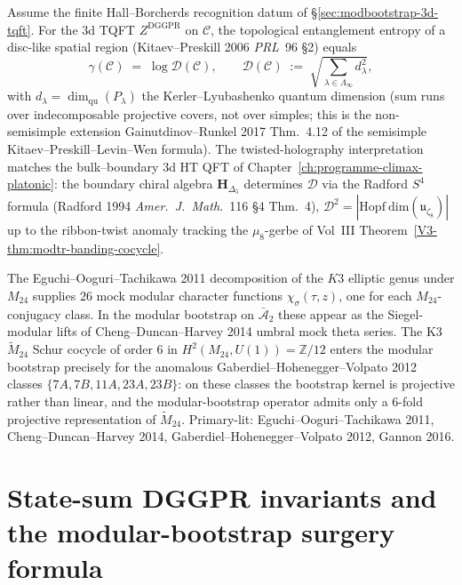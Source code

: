 \begin{remark}
\label{rem:modbootstrap-gamma-topological-entanglement}
Assume the finite Hall--Borcherds recognition datum of
\S\ref{sec:modbootstrap-3d-tqft}.
For the 3d TQFT $Z^{\mathrm{DGGPR}}$ on $\mathcal C$, the topological
entanglement entropy of a disc-like spatial region (Kitaev--Preskill
2006 \emph{PRL}~96 \S 2) equals
\[
 \gamma(\mathcal C)
 \;=\;
 \log\mathcal D(\mathcal C),
 \qquad
 \mathcal D(\mathcal C)
 \;:=\;
 \sqrt{\sum_{\lambda\in\Lambda_\infty}d_\lambda^2},
\]
with $d_\lambda = \dim_{\mathrm{qu}}(P_\lambda)$ the Kerler--Lyubashenko
quantum dimension (sum runs over indecomposable projective covers, not
over simples; this is the non-semisimple extension
Gainutdinov--Runkel 2017 Thm.~4.12 of the semisimple
Kitaev--Preskill--Levin--Wen formula). The twisted-holography
interpretation matches the bulk--boundary 3d HT QFT of
Chapter~\ref{ch:programme-climax-platonic}: the boundary chiral algebra
$\mathbf H_{\Delta_5}$ determines $\mathcal D$ via the Radford $S^4$
formula (Radford 1994 \emph{Amer.~J.~Math.}~116 \S 4 Thm.~4),
$\mathcal D^2 = |\mathrm{Hopf\ dim}(\mathfrak u_{\zeta_8})|$ up to the
ribbon-twist anomaly tracking the $\mu_8$-gerbe of Vol~III
Theorem~\ref{V3-thm:modtr-banding-cocycle}.
\end{remark}

\begin{remark}
\label{rem:modbootstrap-k3-mock-anomaly}
The Eguchi--Ooguri--Tachikawa 2011 decomposition of the $K3$ elliptic
genus under $M_{24}$ supplies $26$ mock modular character functions
$\chi_\sigma(\tau,z)$, one for each $M_{24}$-conjugacy class. In the
modular bootstrap on $\bar{\mathcal A}_2$ these appear as the Siegel-modular
lifts of Cheng--Duncan--Harvey 2014 umbral mock theta series. The K3
$\widetilde M_{24}$ Schur cocycle of order $6$ in
$H^2(M_{24}, U(1)) = \mathbb Z/12$ enters the modular bootstrap precisely
for the anomalous Gaberdiel--Hohenegger--Volpato 2012 classes
$\{7A, 7B, 11A, 23A, 23B\}$: on these classes the bootstrap kernel is
projective rather than linear, and the modular-bootstrap operator admits
only a $6$-fold projective representation of $\widetilde M_{24}$.
Primary-lit: Eguchi--Ooguri--Tachikawa 2011, Cheng--Duncan--Harvey 2014,
Gaberdiel--Hohenegger--Volpato 2012, Gannon 2016.
\end{remark}

\section{State-sum DGGPR invariants and the modular-bootstrap surgery formula}
\label{sec:modbootstrap-state-sum-DGGPR}

